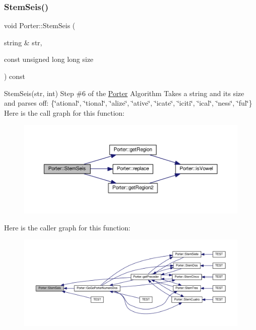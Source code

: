 \subsubsection{\texorpdfstring{Stem\+Seis()}{StemSeis()}}
{\footnotesize\ttfamily void Porter\+::\+Stem\+Seis (\begin{DoxyParamCaption}\item[{string \&}]{str,  }\item[{const unsigned long long}]{size }\end{DoxyParamCaption}) const}

Stem\+Seis(str, int) Step \#6 of the \hyperlink{class_porter}{Porter} Algorithm Takes a string and its size and parses off\+: \{\char`\"{}ational\char`\"{}, \char`\"{}tional\char`\"{}, \char`\"{}alize\char`\"{}, \char`\"{}ative\char`\"{}, \char`\"{}icate\char`\"{}, \char`\"{}iciti\char`\"{}, \char`\"{}ical\char`\"{}, \char`\"{}ness\char`\"{}, \char`\"{}ful\char`\"{}\} Here is the call graph for this function\+:
\nopagebreak
\begin{figure}[H]
\begin{center}
\leavevmode
\includegraphics[width=350pt]{class_porter_a485f69d6797fce65144e0596f3190c2d_cgraph}
\end{center}
\end{figure}
Here is the caller graph for this function\+:
\nopagebreak
\begin{figure}[H]
\begin{center}
\leavevmode
\includegraphics[width=350pt]{class_porter_a485f69d6797fce65144e0596f3190c2d_icgraph}
\end{center}
\end{figure}
\mbox{\label{class_porter_a1015f959403c55d740fff435f0cae439}} 
